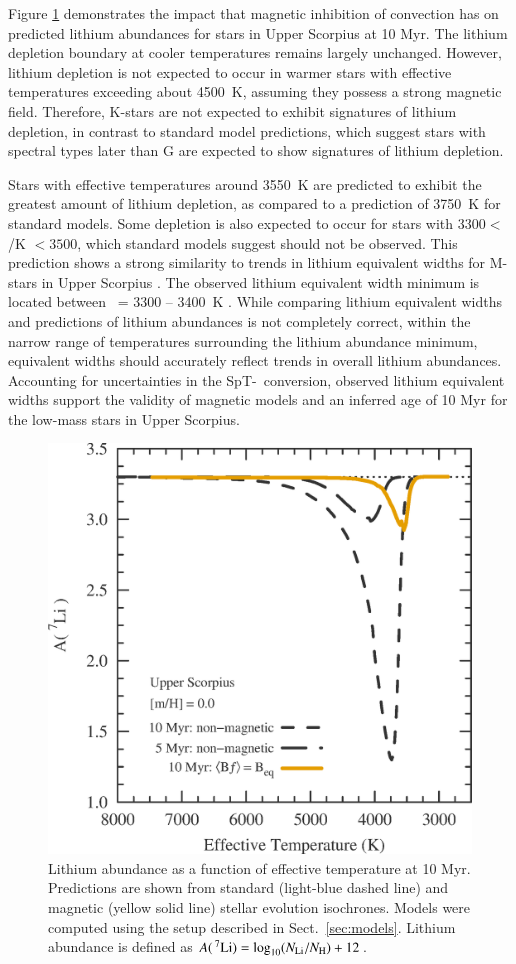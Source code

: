 \documentclass{aa}
\begin{document}
Figure \ref{fig:lithium} demonstrates the impact that magnetic inhibition of convection has on predicted lithium abundances for stars in Upper Scorpius at 10 Myr. The lithium depletion boundary at cooler temperatures remains largely unchanged. However, lithium depletion is not expected to occur in warmer stars with effective temperatures exceeding about 4500~K, assuming they possess a strong magnetic field. Therefore, K-stars are not expected to exhibit signatures of lithium depletion, in contrast to standard model predictions, which suggest stars with spectral types later than G are expected to show signatures of lithium depletion. 

Stars with effective temperatures around 3550~K are predicted to exhibit the greatest amount of lithium depletion, as compared to a prediction of 3750~K for standard models. Some depletion is also expected to occur for stars with $3300 <$ \teff/K $< 3500$, which standard models suggest should not be observed. This prediction shows a strong similarity to trends in lithium equivalent widths for M-stars in Upper Scorpius \citep{Rizzuto2015}. The observed lithium equivalent width minimum is located between \teff\ = 3300 -- 3400~K \citep{Rizzuto2015}. While comparing lithium equivalent widths and predictions of lithium abundances is not completely correct, within the narrow range of temperatures surrounding the lithium abundance minimum, equivalent widths should accurately reflect trends in overall lithium abundances. Accounting for uncertainties in the SpT-\teff\ conversion, observed lithium equivalent widths support the validity of magnetic models and an inferred age of 10 Myr for the low-mass stars in Upper Scorpius. 

\begin{figure}[t]
    \includegraphics[width=0.85\linewidth]{Li7_USco_Beq.eps}
    \caption{Lithium abundance  as a function of effective temperature at 10 Myr. Predictions are shown from standard (light-blue dashed line) and magnetic (yellow solid line) stellar evolution isochrones. Models were computed using the setup described in Sect.~\ref{sec:models}. Lithium abundance is defined as $A(\,^7{\rm Li}) = \log_{10}(N_{\rm Li}/N_{\rm H}) + 12$.}
    \label{fig:lithium}
\end{figure}
\end{document}
